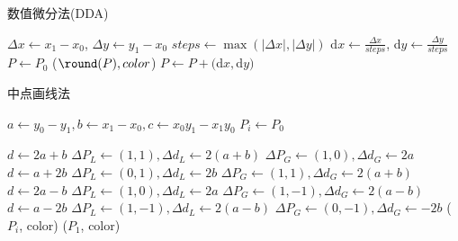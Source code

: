 \documentclass{article}
\begin{document}
\begin{algorithm}
    \caption{数值微分法(DDA)}

    \BlankLine

    $\Delta x \leftarrow x_1 - x_0$, $\Delta y \leftarrow y_1 - x_0$\;
    $steps \leftarrow \max(|\Delta x|, |\Delta y|)$\;
    d$x \leftarrow \frac{\Delta x}{steps}$, d$y \leftarrow \frac{\Delta y}{steps}$\;
    $P \leftarrow P_0$\;
    {
        \putpixel($\round(P), color$)\;
        $P \leftarrow P + ($d$x, $d$y)$\;
    }
\end{algorithm}

\begin{algorithm}
    \caption{中点画线法}

    \BlankLine

    $a\leftarrow y_0-y_1, b\leftarrow x_1-x_0, c\leftarrow x_0y_1-x_1y_0$\;
    $P_i\leftarrow P_0$\;

    {
        $d\leftarrow 2a+b$\;
        $\Delta P_L \leftarrow (1,1), \Delta d_L \leftarrow 2(a+b)$\;
        $\Delta P_G \leftarrow (1,0), \Delta d_G \leftarrow 2a$\;
    }
    {
        $d\leftarrow a+2b$\;
        $\Delta P_L \leftarrow (0,1), \Delta d_L \leftarrow 2b$\;
        $\Delta P_G \leftarrow (1,1), \Delta d_G \leftarrow 2(a+b)$\;
    }
    \uElseIf{$k\in[-1,0)$}
    {
        $d\leftarrow 2a-b$\;
        $\Delta P_L \leftarrow (1,0), \Delta d_L \leftarrow 2a$\;
        $\Delta P_G \leftarrow (1,-1), \Delta d_G \leftarrow 2(a-b)$\;
    }
    \Else 
    {
        $d\leftarrow a-2b$\;
        $\Delta P_L \leftarrow (1,-1), \Delta d_L \leftarrow 2(a-b)$\;
        $\Delta P_G \leftarrow (0,-1), \Delta d_G \leftarrow -2b$\;
    }
    {
        \putpixel($P_i$, color)\;
    }
    \putpixel($P_1$, color)\;
\end{algorithm}
\end{document}
